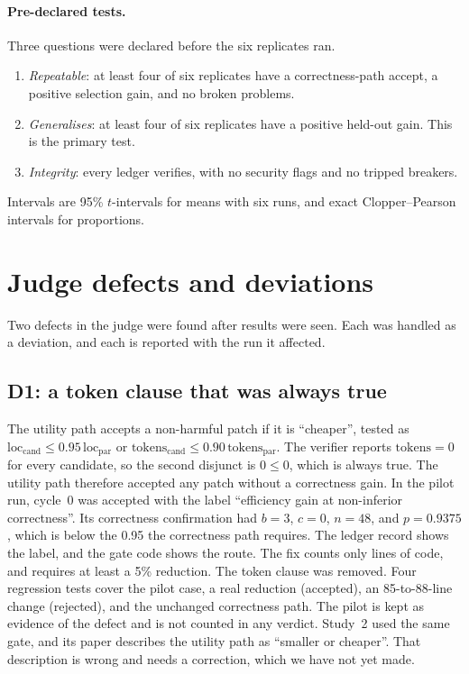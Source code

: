 \documentclass[11pt]{article}
\begin{document}
\paragraph{Pre-declared tests.} Three questions were declared before the six replicates ran.
\begin{enumerate}\setlength\itemsep{1pt}
\item \emph{Repeatable}: at least four of six replicates have a correctness-path accept, a positive selection gain, and no broken problems.
\item \emph{Generalises}: at least four of six replicates have a positive held-out gain. This is the primary test.
\item \emph{Integrity}: every ledger verifies, with no security flags and no tripped breakers.
\end{enumerate}
Intervals are 95\% $t$-intervals for means with six runs, and exact Clopper--Pearson intervals for proportions.

\section{Judge defects and deviations}
\label{sec:defects}

Two defects in the judge were found after results were seen. Each was handled as a deviation, and each is reported with the run it affected.

\subsection{D1: a token clause that was always true}

The utility path accepts a non-harmful patch if it is ``cheaper'', tested as $\mathrm{loc}_{\mathrm{cand}}\le 0.95\,\mathrm{loc}_{\mathrm{par}}$ or $\mathrm{tokens}_{\mathrm{cand}}\le 0.90\,\mathrm{tokens}_{\mathrm{par}}$.
The verifier reports $\mathrm{tokens}=0$ for every candidate, so the second disjunct is $0\le 0$, which is always true. The utility path therefore accepted any patch without a correctness gain.
In the pilot run, cycle~0 was accepted with the label ``efficiency gain at non-inferior correctness''. Its correctness confirmation had $b=3$, $c=0$, $n=48$, and $p=0.9375$, which is below the 0.95 the correctness path requires. The ledger record shows the label, and the gate code shows the route.
The fix counts only lines of code, and requires at least a 5\% reduction. The token clause was removed. Four regression tests cover the pilot case, a real reduction (accepted), an 85-to-88-line change (rejected), and the unchanged correctness path.
The pilot is kept as evidence of the defect and is not counted in any verdict. Study~2 used the same gate, and its paper describes the utility path as ``smaller or cheaper''. That description is wrong and needs a correction, which we have not yet made.
\end{document}
